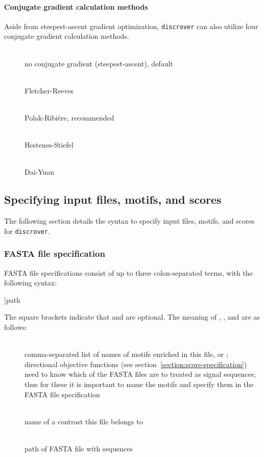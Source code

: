 \documentclass[a4paper]{article}
\newcommand{\discrover}[0]{\texttt{discrover}}
\begin{document}
\newcommand{\Item}[1]{\item[#1] \hfill \\}

\paragraph{Conjugate gradient calculation methods}
Aside from steepest-ascent gradient optimization, \discrover{} can also utilize four conjugate gradient calculation methods.
\begin{description}
  \Item{}
    no conjugate gradient (steepest-ascent), default
  \Item{}
    Fletcher-Reeves
  \Item{}
    Polak-Ribi\`ere, recommended
  \Item{}
    Hestenes-Stiefel
  \Item{}
    Dai-Yuan
\end{description}

\subsection{Specifying input files, motifs, and scores}
\label{section:specification}
The following section details the syntax to specify input files, motifs, and scores for \discrover{}.

\subsubsection{FASTA file specification}
\label{section:fasta-specification}
FASTA file specifications consist of up to three colon-separated terms, with the following syntax:

\begin{verbbox}
[names:[contrast:]]path
\end{verbbox}
\fbox{\theverbbox[t]}

The square brackets indicate that  and  are optional.
The meaning of , , and  are as follows:

\begin{description}
 \Item{}
   comma-separated list of names of motifs enriched in this file, or ;
   directional objective functions (see section~\ref{section:score-specification}) need to know which of the FASTA files are to treated as signal sequences;
   thus for these it is important to name the motifs and specify them in the FASTA file specification
 \Item{}
   name of a contrast this file belongs to
 \Item{}
   path of FASTA file with sequences
\end{description}
\end{document}
